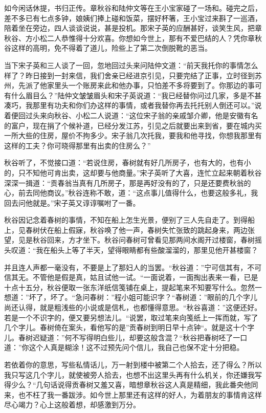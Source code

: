 \documentclass[12pt,UTF8]{ctexbook}
\begin{document}
{{{如今闲话休提，书归正传。章秋谷和陆仲文等在王小宝家碰了一场和。碰完之后，差不多已有七点多钟，娘姨们捧上碰和饭菜，摆好杯箸，王小宝过来斟了一巡酒，陪着坐在旁边，四人谈谈说说，甚是投机。那宋子英的应酬甚好，谈笑生风，把章秋谷、方小松二人恭惟得十分欢喜。你想如今世上，那有不爱巴结的人？凭你章秋谷这样的高明，免不得着了道儿，险些上了第二次倒脱靴的恶当。

当下宋子英和三人谈了一回，忽地回过头来问陆仲文道：“前天我托你的事情怎么样了？昨日接到一封来信，我们舍亲已经进京引见，只要完结了正事，立时径到苏州，先派了他家里头一个账房来此和他办事，只怕差不多将要到了。你那边的事可有什么眉目么？”陆仲文皱皱眉头和宋子英说道：“我已经替你问过几家，多是不甚凑巧，我那里有功夫和你们办这样的事情，或者我替你再去托托别人倒还可以。”说着便回过头来向秋谷、小松二人说道：“这位宋子翁的亲戚邹介卿，他是安徽有名的富户，现在捐了个候补道，已经分发江苏，引见之后就要出来到省，要在城内买一所大些的住房，屋价不拘多少。宋子翁几次托我，要我和他寻找，你想我那里有这样的工夫？你可晓得那里有出卖的住房么？”

秋谷听了，不觉接口道：“若说住房，春树就有好几所房子，也有大的，也有小的，只不知他可肯出卖，这却要与他商量。”宋子英听了大喜，连忙立起来朝着秋谷深深一揖道：“贡春翁当真有几所房子，那是再好没有的了，只是还要费秋翁的心，前去同他商议。”秋谷连称不敢，道：“这点事儿值得什么，也要这般多礼，我回去问他就是。”宋子英又谆谆嘱咐了一番。

秋谷因记念着春树的事情，不知在船上怎生光景，便别了三人先自走了。到得船上，见春树伏在船上假寐，秋谷唤了他一声，春树失忙张致的跳起身来，两边张望，见是秋谷回来，方才坐下。秋谷问春树可曾看见那两间水阁开过楼窗，春树摇头叹道：“我在船头上等了半天，望得眼睛都有些酸溜溜的，那里见他开甚楼窗？

并且连人声都一毫没有，不要是上了那妇人的当罢。“秋谷道：”宁可信其有，不可信其无。不管他是假是真，姑且试他一试。“一面说着，一面掏出表来一看，已是十点十五分，秋谷便取一张东洋纸信笺铺在桌上，提起笔来不知要写什么。忽然一想道：”坏了，坏了。“急问春树：”程小姐可能识字？“春树道：”眼前的几个字儿尚还认得，就是粗浅些的小说或是信札，也都懂得意思。“秋谷喜道：”这便还好。若是一个不识字的，便又要另想法儿。“说罢，取过笔来向笺纸上一挥而就，写了几个字儿。春树倚在案头，看他写的是”贡春树到明日早十点钟“。就是这十个字儿。春树迟疑道：”何不写得明白些儿，却要这般含混？“秋谷把春树呸了一口道：”你这个人真是糊涂！这不过预先问个信儿，我自己也保不定十分把稳。

若依着你的意思，写些私情话儿，万一射到楼中被第二个人拾去，还了得么？所以我只写这几个字儿，就使被旁人拾去，也想不出这里头再有什么机关，你还嫌我写得少么？“几句话说得贡春树又羞又喜，暗想章秋谷这人真是精细，我此番央他同来，也不枉了我一番跋涉。如今世上那里还有这样的好人，为着朋友的事情肯这样尽心竭力？心上这般着想，却感激到万分。

}}}
\end{document}
